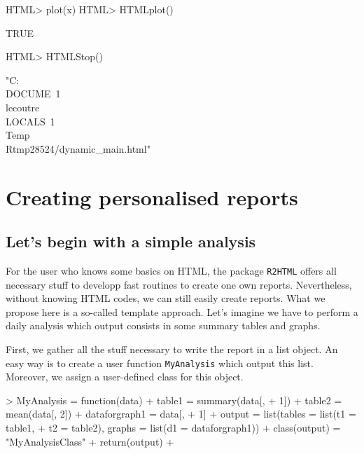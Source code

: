 \documentclass[a4paper]{article}
\newcommand{\HTML}{{\tt R2HTML}}
\begin{document}
\begin{Schunk}
\begin{Sinput}
HTML> plot(x)
HTML> HTMLplot()
\end{Sinput}
\begin{Soutput}
[1] TRUE
\end{Soutput}
\begin{Sinput}
HTML> HTMLStop()
\end{Sinput}
\begin{Soutput}
[1] "C:\\DOCUME~1\\lecoutre\\LOCALS~1\\Temp\\Rtmp28524/dynamic_main.html"
\end{Soutput}
\end{Schunk}

\section*{Creating personalised reports}

\subsection*{Let's begin with a simple analysis} 

For the user who knows some basics on HTML, the package \HTML{} offers all necessary stuff to developp fast routines to create one own reports. Nevertheless, without knowing HTML codes, we can still easily create reports. What we propose here is a so-called template approach. Let's imagine we have to perform a daily analysis which output consists in some summary tables and graphs. 

First, we gather all the stuff necessary to write the report in a list object. An easy way is to create a user function \verb+MyAnalysis+ which output this list. Moreover, we assign a user-defined class for this object.


\begin{Schunk}
\begin{Sinput}
> MyAnalysis = function(data) {
+     table1 = summary(data[, 
+         1])
+     table2 = mean(data[, 2])
+     dataforgraph1 = data[, 
+         1]
+     output = list(tables = list(t1 = table1, 
+         t2 = table2), graphs = list(d1 = dataforgraph1))
+     class(output) = "MyAnalysisClass"
+     return(output)
+ }
\end{Sinput}
\end{Schunk}
\end{document}
